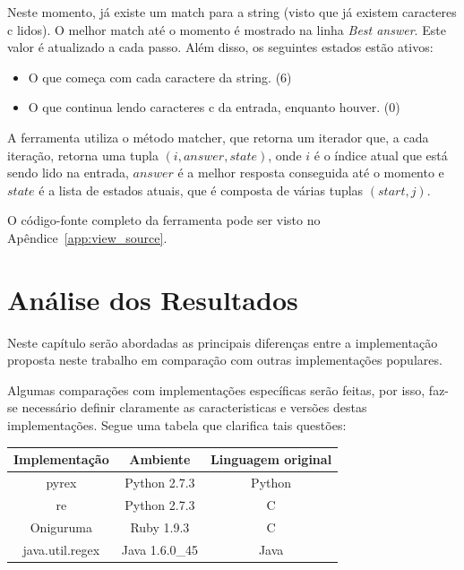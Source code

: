 \documentclass[a4paper,12pt,oneside,onecolumn]{uerj}
\begin{document}
Neste momento, já existe um match para a string (visto que já existem caracteres c lidos). O melhor match até o momento é mostrado na linha \emph{Best answer}. Este valor é atualizado a cada passo. Além disso, os seguintes estados estão ativos:

\begin{itemize}
\item{O que começa com cada caractere da string. (6)}
\item{O que continua lendo caracteres c da entrada, enquanto houver. (0)}
\end{itemize}

A ferramenta utiliza o método matcher, que retorna um iterador que, a cada iteração, retorna uma tupla $(i, answer, state)$, onde $i$ é o índice atual que está sendo lido na entrada, $answer$ é a melhor resposta conseguida até o momento e $state$ é a lista de estados atuais, que é composta de várias tuplas $(start, j)$.

O código-fonte completo da ferramenta pode ser visto no Apêndice~\ref{app:view_source}.

\chapter{Análise dos Resultados}\label{cap:analysis}

Neste capítulo serão abordadas as principais diferenças entre a implementação proposta neste trabalho em comparação com outras implementações populares.

Algumas comparações com implementações específicas serão feitas, por isso, faz-se necessário definir claramente as caracteristicas e versões destas implementações. Segue uma tabela que clarifica tais questões:

\begin{center}
	\begin{tabular}{ c | c | c }
		{\bf Implementação} & {\bf Ambiente} & {\bf Linguagem original} \\
		\hline 
		pyrex & Python 2.7.3 & Python \\
		re & Python 2.7.3 & C \\
		Oniguruma & Ruby 1.9.3 & C \\
		java.util.regex & Java 1.6.0\_45 & Java \\
	\end{tabular}
\end{center}
\end{document}
